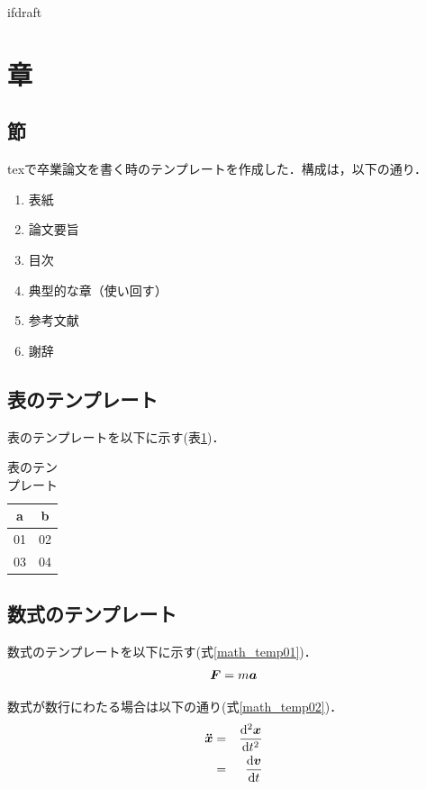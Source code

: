 \expandafter\ifx\csname ifdraft\endcsname\relax
 
\fi

\section{章}
\subsection{節}
texで卒業論文を書く時のテンプレートを作成した．構成は，以下の通り．
\begin{enumerate}
  \item 表紙
  \item 論文要旨
  \item 目次
  \item 典型的な章（使い回す）
  \item 参考文献
  \item 謝辞
\end{enumerate}

\subsection{表のテンプレート}
表のテンプレートを以下に示す(表\ref{tb:table_temp})．
\begin{table}[H]
  \begin{center}
   \caption{表のテンプレート}
    \label{tb:table_temp}
    \begin{tabular}{|c||c|} 
\hline
a & b  \\ \hline \hline
 	01 & 02   \\ \hline
	03 & 04   \\ \hline
    \end{tabular}
  \end{center}
\end{table}

\subsection{数式のテンプレート}
数式のテンプレートを以下に示す(式\ref{math_temp01})．
\begin{eqnarray}
\label{math_temp01}
  \mbox{\boldmath $F$} = m\mbox{\boldmath $a$}
\end{eqnarray}

数式が数行にわたる場合は以下の通り(式\ref{math_temp02})．
\begin{eqnarray}
\label{math_temp02}
  \mbox{\boldmath $\ddot{x}$} &=& \frac{\mathrm{d^2}\mbox{\boldmath $x$}}{\mathrm{d}t^2} \nonumber \\
  &=& \frac{\mathrm{d}\mbox{\boldmath $v$}}{\mathrm{d}t}
\end{eqnarray}

